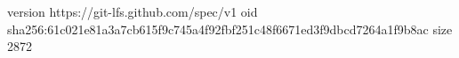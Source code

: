version https://git-lfs.github.com/spec/v1
oid sha256:61c021e81a3a7cb615f9c745a4f92fbf251c48f6671ed3f9dbcd7264a1f9b8ac
size 2872
